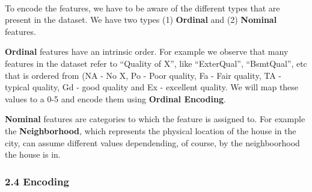 \documentclass[11pt]{article}
\begin{document}
    \begin{center}
    \end{center}
    { \hspace*{\fill} \\}
    
    To encode the features, we have to be aware of the different types that
are present in the dataset. We have two types (1) \textbf{Ordinal} and
(2) \textbf{Nominal} features.

\textbf{Ordinal} features have an intrinsic order. For example we
observe that many features in the dataset refer to ``Quality of X'',
like ``ExterQual'', ``BsmtQual'', etc that is ordered from (NA - No X,
Po - Poor quality, Fa - Fair quality, TA - typical quality, Gd - good
quality and Ex - excellent quality. We will map these values to a 0-5
and encode them using \textbf{Ordinal Encoding}.

\textbf{Nominal} features are categories to which the feature is
assigned to. For example the \textbf{Neighborhood}, which represents the
physical location of the house in the city, can assume different values
dependending, of course, by the neighboorhood the house is in.

    \subsubsection{2.4 Encoding}\label{encoding}
\end{document}
